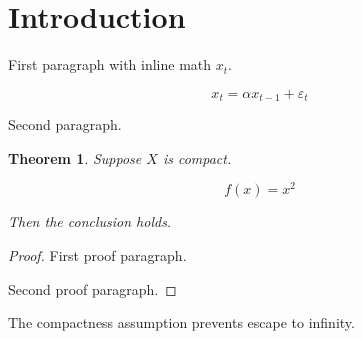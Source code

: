\documentclass{article}
\newtheorem{theorem}{Theorem}
\begin{document}
\section{Introduction}

First paragraph with inline math $x_t$.

\begin{equation}
x_t = \alpha x_{t-1} + \varepsilon_t
\end{equation}

Second paragraph.

\begin{theorem}
Suppose $X$ is compact.

\begin{equation}
f(x) = x^2
\end{equation}

Then the conclusion holds.
\end{theorem}

\begin{proof}
First proof paragraph.

Second proof paragraph.
\end{proof}

The compactness assumption prevents escape to infinity.
\end{document}
